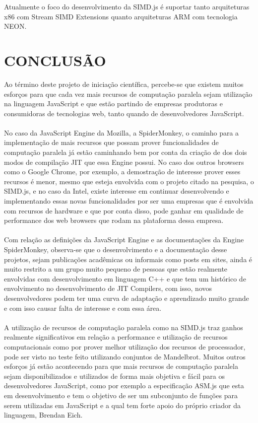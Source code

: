 \documentclass[12pt,a4paper]{article}
\begin{document}
Atualmente o foco do desenvolvimento da SIMD.js é suportar tanto arquiteturas x86 com Stream SIMD Extensions quanto arquiteturas ARM com tecnologia NEON.

\newpage
\section{CONCLUSÃO}
\label{sec:section8}

Ao término deste projeto de iniciação científica, percebe-se que existem muitos esforços para que cada vez mais recursos de computação paralela sejam utilização na linguagem JavaScript e que estão partindo de empresas produtoras e consumidoras de tecnologias web, tanto quando de desenvolvedores JavaScript. \\
\\
No caso da JavaScript Engine da Mozilla, a SpiderMonkey, o caminho para a implementação de mais recursos que possam prover funcionalidades de computação paralela já estão caminhando bem por conta da criação de dos dois modos de compilação JIT que essa Engine possui. No caso dos outros browsers como o Google Chrome, por exemplo, a demostração de interesse prover esses recursos é menor, mesmo que esteja envolvida com o projeto citado na pesquisa, o SIMD.js, e no caso da Intel, existe interesse em continuar desenvolvendo e implementando essas novas funcionalidades por ser uma empresas que é envolvida com recursos de hardware e que por conta disso, pode ganhar em qualidade de performance dos web browsers que rodam na plataforma dessa empresa. \\
\\
Com relação as definições da JavaScript Engine e as documentações da Engine SpiderMonkey, observa-se que o desenvolvimento e a documentação desse projetos, sejam publicações acadêmicas ou informais como posts em sites, ainda é muito restrito a um grupo muito pequeno de pessoas que estão realmente envolvidas com desenvolvimento em linguagem C++ e que tem um histórico de envolvimento no desenvolvimento de JIT Compilers, com isso, novos desenvolvedores podem ter uma curva de adaptação e aprendizado muito grande e com isso causar falta de interesse e com essa área. \\
\\
A utilização de recursos de computação paralela como na SIMD.js traz ganhos realmente significativos em relação a performance e utilização de recursos computacionais como por prover melhor utilização dos recursos de processador, pode ser visto no teste feito utilizando conjuntos de Mandelbrot. Muitos outros esforços já estão acontecendo para que mais recursos de computação paralela sejam disponibilizados e utilizados de forma mais objetiva e fácil para os desenvolvedores JavaScript, como por exemplo a especificação ASM.js que esta em desenvolvimento e tem o objetivo de ser um subconjunto de funções para serem utilizadas em JavaScript e a qual tem forte apoio do próprio criador da linguagem, Brendan Eich.
\end{document}
